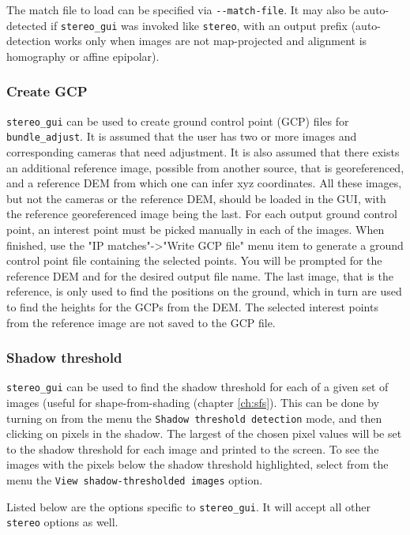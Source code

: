 The match file to load can be specified via \texttt{-\/-match-file}.  It
may also be auto-detected if \texttt{stereo\_gui} was invoked like
\texttt{stereo}, with an output prefix (auto-detection works only when
images are not map-projected and alignment is homography or affine
epipolar).

\subsubsection{Create GCP}
\label{bagcp}

\texttt{stereo\_gui} can be used to create
ground control point (GCP) files for \texttt{bundle\_adjust}. It is
assumed that the user has two or more images and corresponding cameras
that need adjustment. It is also assumed that there exists an additional
reference image, possible from another source, that is georeferenced,
and a reference DEM from which one can infer xyz coordinates. All these
images, but not the cameras or the reference DEM, should be loaded in the
GUI, with the reference georeferenced image being the last. For each
output ground control point, an interest point must be picked manually
in each of the images. When finished, use the "IP matches"->"Write GCP
file" menu item to generate a ground control point file containing the
selected points.  You will be prompted for the reference DEM and for the
desired output file name. The last image, that is the reference, is only
used to find the positions on the ground, which in turn are used to find
the heights for the GCPs from the DEM. The selected interest points from
the reference image are not saved to the GCP file.

\subsubsection{Shadow threshold}
\texttt{stereo\_gui} can be used to find the shadow threshold for each
of a given set of images (useful for shape-from-shading (chapter \ref{ch:sfs}).
This can be done by turning on from the menu
the \texttt{Shadow threshold detection} mode, and then clicking on
pixels in the shadow. The largest of the chosen pixel values will be set
to the shadow threshold for each image and printed to the screen. To see
the images with the pixels below the shadow threshold highlighted,
select from the menu the \texttt{View shadow-thresholded images} option.

\clearpage
Listed below are the options specific to \texttt{stereo\_gui}. It will accept
all other \texttt{stereo} options as well.

